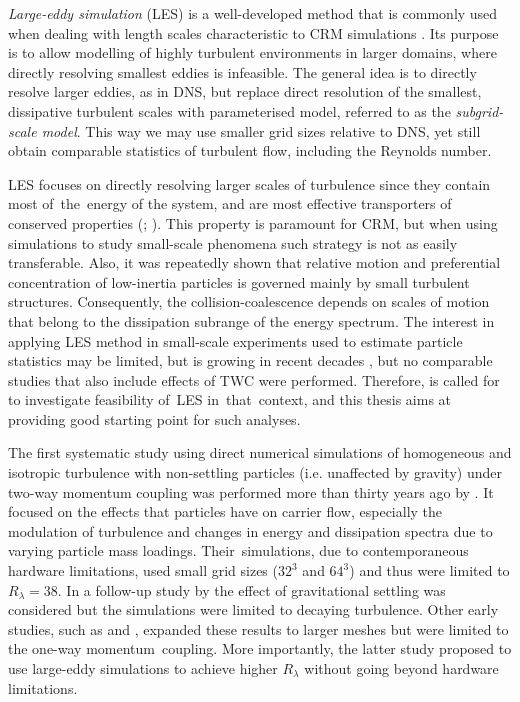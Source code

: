 \documentclass{pracamgren}
\begin{document}
\emph{Large-eddy simulation} (LES) is a well-developed method that is commonly used when dealing with length scales characteristic to CRM simulations \parencite{Guichard2017}.
Its purpose is to allow modelling of highly turbulent environments in larger domains, where directly resolving smallest eddies is infeasible.
The general idea is to directly resolve larger eddies, as in DNS, but replace direct resolution of the smallest, dissipative turbulent scales with parameterised model, referred to as the \emph{subgrid-scale model}.
This way we may use smaller grid sizes relative to DNS, yet still obtain comparable statistics of turbulent flow, including the Reynolds number.

LES focuses on directly resolving larger scales of turbulence since they contain most of~the~energy of the system, and are most effective transporters of conserved properties (\cite[367]{Ferziger2020}; \cite[352]{Pope2000}).
This property is paramount for CRM, but when using simulations to study small-scale phenomena such strategy is not as easily transferable.
Also, it was repeatedly shown that relative motion and preferential concentration of low-inertia particles is governed mainly by small turbulent structures.
Consequently, the collision-coalescence depends on scales of motion that belong to the dissipation subrange of the energy spectrum.
The interest in applying LES method in small-scale experiments used to estimate particle statistics may be limited, but is growing in recent decades \parencite{Fede2006, Jin2010, Rosa2017}, but no comparable studies that also include effects of TWC were performed.
Therefore, is called for to investigate feasibility of~LES in~that~context, and this thesis aims at providing good starting point for such analyses.

\medskip

The first systematic study using direct numerical simulations of homogeneous and isotropic turbulence with non-settling particles (i.e. unaffected by gravity) under two-way momentum coupling was performed more than thirty years ago by \textcite{Squires1990}.
It focused on the effects that particles have on carrier flow, especially the modulation of turbulence and changes in energy and dissipation spectra due to varying particle mass loadings.
Their~simulations, due to contemporaneous hardware limitations, used small grid sizes ($32^3$ and $64^3$) and thus were limited to $R_{\lambda} = 38$.
In a follow-up study by \textcite{Elghobashi1993} the effect of gravitational settling was considered but the simulations were limited to decaying turbulence.
Other early studies, such as \textcite{Wang1993} and \textcite{Yang1998}, expanded these results to larger meshes but were limited to the one-way momentum~coupling.
More importantly, the latter study \parencite{Yang1998} proposed to use large-eddy simulations to achieve higher $R_{\lambda}$ without going beyond hardware limitations.
\end{document}
